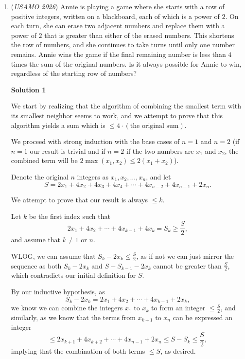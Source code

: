 \begin{enumerate}
 $f(x)$ has a period of 1. Thus, the real $x$ that attains the maximal satisfies
 \[x\in\bigcup_{j\in\mathbb{Z}}\left[j-\frac{1}{n}, \, j\right)\]



	\item (\textit{USAMO 2026}) Annie is playing a game where she starts with a row of positive integers, written on a blackboard, each of which is a power of $2$. On each turn, she can erase two adjacent numbers and replace them with a power of $2$ that is greater than either of the erased numbers. This shortens the row of numbers, and she continues to take turns until only one number remains. Annie wins the game if the final remaining number is less than $4$ times the sum of the original numbers. Is it always possible for Annie to win, regardless of the starting row of numbers?


 



\textbf{Solution 1}

We start by realizing that the algorithm of combining the smallest term with its smallest neighbor seems to work, and we attempt to prove that this algorithm yields a sum which is $\le 4\cdot(\text{the original sum})$.

 We proceed with strong induction with the base cases of $n=1$ and $n=2$ (if $n=1$ our result is trivial and if $n=2$ if the two numbers are $x_1$ and $x_2$, the combined term will be $2\max(x_1,x_2)\le 2(x_1+x_2)$).

 Denote the original $n$ integers as $x_1,x_2,\dots,x_n$, and let
 \[S=2x_1+4x_2+4x_3+4x_4+\cdots+4x_{n-2}+4x_{n-1}+2x_n.\]

 We attempt to prove that our result is always $\le k$.

 Let $k$ be the first index such that
 \[2x_1+4x_2+\cdots+4x_{k-1}+4x_k=S_k\ge \frac{S}{2},\]and assume that $k\ne 1$ or $n$.

 WLOG, we can assume that $S_k-2x_k\le \frac{S}{2}$, as if not we can just mirror the sequence as both $S_k-2x_k$ and $S-S_{k-1}-2x_k$ cannot be greater than $\frac{S}{2}$, which contradicts our initial definition for $S$.

 By our inductive hypothesis, as
 \[S_k-2x_k=2x_1+4x_2+\cdots+4x_{k-1}+2x_k,\]we know we can combine the integers $x_1$ to $x_k$ to form an integer $\le \frac{S}{2}$, and similarly, as we know that the terms from $x_{k+1}$ to $x_n$ can be expressed an integer
 \[\le 2x_{k+1}+4x_{k+2}+\cdots+4x_{n-1}+2x_n\le S-S_k\le \frac{S}{2},\]implying that the combination of both terms $\le S$, as desired.


\end{enumerate}
